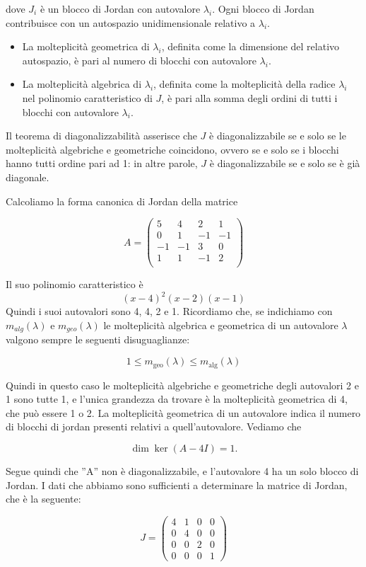 dove $J_i$ \`e un blocco di Jordan con autovalore $\lambda_i$. Ogni
blocco di Jordan contribuisce con un autospazio unidimensionale
relativo a $\lambda_i$.\\
\begin{itemize}
\item La molteplicit\`a geometrica di $\lambda_i$, definita come la
  dimensione del relativo autospazio, \`e pari al numero di blocchi con
  autovalore $\lambda_i$.
\item La molteplicit\`a algebrica di $\lambda_i$, definita come la
  molteplicit\`a della radice $\lambda_i$ nel polinomio caratteristico di
  $J$, \`e pari alla somma degli ordini di tutti i blocchi con autovalore
$\lambda_i$.
\end{itemize}
Il teorema di diagonalizzabilit\`a asserisce che $J$ \`e diagonalizzabile
se e solo se le molteplicit\`a algebriche e geometriche coincidono,
ovvero se e solo se i blocchi hanno tutti ordine pari ad 1: in altre
parole, $J$ \`e diagonalizzabile se e solo se \`e gi\`a diagonale.


\begin{example}
Calcoliamo la forma canonica di Jordan della matrice 

$$A =
\begin{pmatrix}
 5 &  4 &  2 &  1 \\
 0 &  1 & -1 & -1 \\
-1 & -1 &  3 &  0 \\ 
 1 &  1 & -1 &  2 \\
\end{pmatrix}$$

Il suo polinomio caratteristico \`e $$ (x-4)^2(x-2)(x-1) $$ Quindi i suoi
 autovalori sono 4, 4, 2 e 1. Ricordiamo che, se indichiamo con
 $m_{alg}(\lambda)$ e
$m_{geo}(\lambda)$ le molteplicit\`a algebrica e geometrica di un autovalore
$\lambda$ valgono sempre le seguenti disuguaglianze:

$$ 1 \leq m_\textrm{geo}(\lambda) \leq m_\textrm{alg}(\lambda) $$

Quindi in questo caso le molteplicit\`a algebriche e geometriche degli autovalori
 2 e 1 sono tutte 1, e l'unica grandezza da trovare \`e la molteplicit\`a
geometrica di 4, che può essere 1 o 2. La molteplicit\`a geometrica di un
autovalore indica il numero di blocchi di jordan presenti relativi a 
quell'autovalore. Vediamo che

$$ \dim\ker (A-4I) = 1. $$

Segue quindi che ''A'' non \`e diagonalizzabile, e l'autovalore 4 ha un solo
blocco di Jordan. I dati che abbiamo sono sufficienti a determinare la matrice
 di Jordan, che \`e la seguente:

$$J=\begin{pmatrix}
4 & 1 & 0 & 0 \\
0 & 4 & 0 & 0 \\
0 & 0 & 2 & 0 \\
0 & 0 & 0 & 1 \end{pmatrix}$$
\end{example}

